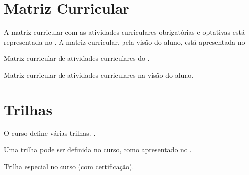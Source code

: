 \documentclass[a3]{ppc-ufscar}
\begin{document}
\section{Matriz Curricular}
\ptbrparagrafo[45]

A matriz curricular com as atividades curriculares obrigatórias e optativas está representada no . A matriz curricular, pela visão do aluno, está apresentada no 

\begin{landscape}
    \begin{quadro}
        \caption{Matriz curricular de atividades curriculares do .}
        \label{quadro:matriz-completa}
        \begin{center}
            \PPCMatrizCurricular
        \end{center}
    \end{quadro}
\end{landscape}

\begin{quadro}
    \caption{Matriz curricular de atividades curriculares na visão do aluno.}
    \label{quadro:matriz-aluno}
    \begin{center}
    \end{center}
\end{quadro}

\ptbrparagrafo[70]


\section{Trilhas}

O curso define várias trilhas. \ptbrparagrafo[70].

Uma trilha pode ser definida no curso, como apresentado no .



\begin{quadro}
    \caption{Trilha especial no curso (com certificação).}
    \label{quadro:trilha}
    \begin{center}
        \PPCMatrizCurricular[trilha]
    \end{center}
\end{quadro}
\end{document}
